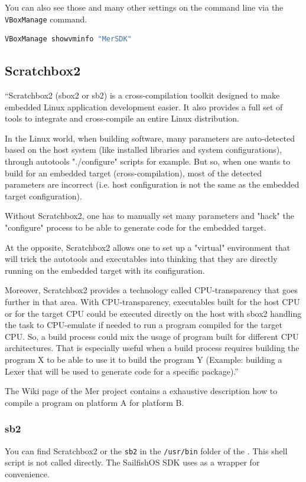 You can also see those and many other settings on the command line via the \verb,VBoxManage, command.
\begin{lstlisting}[language=bash]
VBoxManage showvminfo "MerSDK"
\end{lstlisting}
%
%
\subsection{Scratchbox2}\label{subsec:scratchbox2}
%
``Scratchbox2 (sbox2 or sb2) is a cross-compilation toolkit designed to make embedded Linux application development easier. It also provides a full set of tools to integrate and cross-compile an entire Linux distribution.

In the Linux world, when building software, many parameters are auto-detected based on the host system (like installed libraries and system configurations), through autotools "./configure" scripts for example. But so, when one wants to build for an embedded target (cross-compilation), most of the detected parameters are incorrect (i.e. host configuration is not the same as the embedded target configuration).

Without Scratchbox2, one has to manually set many parameters and "hack" the "configure" process to be able to generate code for the embedded target.

At the opposite, Scratchbox2 allows one to set up a "virtual" environment that will trick the autotools and executables into thinking that they are directly running on the embedded target with its configuration.

Moreover, Scratchbox2 provides a technology called CPU-transparency that goes further in that area. With CPU-transparency, executables built for the host CPU or for the target CPU could be executed directly on the host with sbox2 handling the task to CPU-emulate if needed to run a program compiled for the target CPU. So, a build process could mix the usage of program built for different CPU architectures. That is especially useful when a build process requires building the program X to be able to use it to build the program Y (Example: building a Lexer that will be used to generate code for a specific package).''\cite{wiki02}

The Wiki page of the Mer project contains a exhaustive description how to compile a program on platform A for platform B\cite{mer01}.
%
\subsubsection{sb2}\label{subsubsec:sb2}
%
You can find Scratchbox2 or the \verb,sb2, in the \verb,/usr/bin, folder of the . This shell script is not called directly. The SailfishOS SDK uses  as a wrapper for convenience.
%
%
